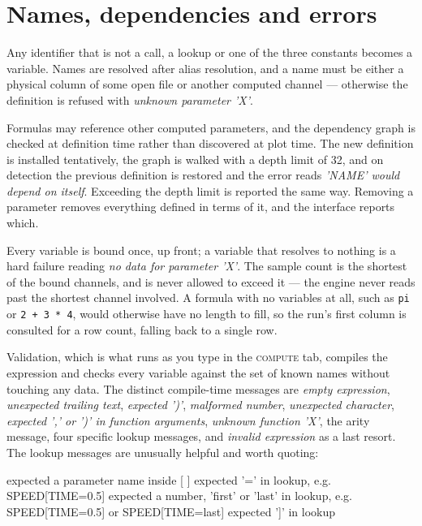 \documentclass[11pt,a4paper,oneside]{report}
\newcommand{\code}[1]{\texttt{#1}}
\newcommand{\tab}[1]{\textsc{#1}}
\begin{document}
\section{Names, dependencies and errors}

Any identifier that is not a call, a lookup or one of the three constants becomes
a variable. Names are resolved after alias resolution, and a name must be either
a physical column of some open file or another computed channel --- otherwise the
definition is refused with \emph{unknown parameter 'X'}.

Formulas may reference other computed parameters, and the dependency graph is
checked at definition time rather than discovered at plot time. The new
definition is installed tentatively, the graph is walked with a depth limit of
32, and on detection the previous definition is restored and the error reads
\emph{'NAME' would depend on itself}. Exceeding the depth limit is reported the
same way. Removing a parameter removes everything defined in terms of it, and the
interface reports which.

Every variable is bound once, up front; a variable that resolves to nothing is a
hard failure reading \emph{no data for parameter 'X'}. The sample count is the
shortest of the bound channels, and is never allowed to exceed it --- the engine
never reads past the shortest channel involved. A formula with no variables at
all, such as \code{pi} or \code{2 + 3 * 4}, would otherwise have no length to
fill, so the run's first column is consulted for a row count, falling back to a
single row.

Validation, which is what runs as you type in the \tab{compute} tab, compiles the
expression and checks every variable against the set of known names without
touching any data. The distinct compile-time messages are \emph{empty
expression}, \emph{unexpected trailing text}, \emph{expected ')'},
\emph{malformed number}, \emph{unexpected character}, \emph{expected ',' or ')'
in function arguments}, \emph{unknown function 'X'}, the arity message, four
specific lookup messages, and \emph{invalid expression} as a last resort. The
lookup messages are unusually helpful and worth quoting:

\begin{aoecode}
expected a parameter name inside [ ]
expected '=' in lookup, e.g. SPEED[TIME=0.5]
expected a number, 'first' or 'last' in lookup,
    e.g. SPEED[TIME=0.5] or SPEED[TIME=last]
expected ']' in lookup
\end{aoecode}
\end{document}
